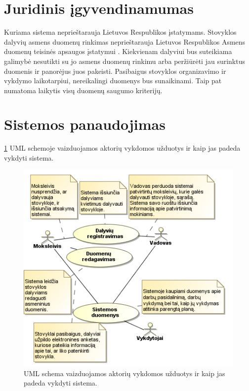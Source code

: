 \section{Juridinis įgyvendinamumas}

Kuriama sistema neprieštarauja Lietuvos Respublikos įstatymams. Stovyklos 
dalyvių asmens duomenų rinkimas neprieštarauja Lietuvos Respublikos 
Asmens duomenų teisinės apsaugos įstatymui \cite{istat_duom_apsaug}.
Kiekvienam dalyviui bus 
suteikiama galimybė nesutikti su jo asmens duomenų rinkimu arba 
peržiūrėti jau surinktus duomenis ir panorėjus juos pakeisti. 
Pasibaigus stovyklos organizavimo ir vykdymo laikotarpiui, nereikalingi 
duomenys bus sunaikinami. Taip pat numatoma laikytis visų duomenų saugumo 
kriterijų.

\section{Sistemos panaudojimas}

\ref{fig:uml_tasks} UML schemoje vaizduojamos aktorių vykdomos užduotys ir 
kaip jas padeda vykdyti sistema.

\begin{figure}[h!]
  \begin{center}
    \includegraphics[scale=0.8]{images/sistemos_panaudojimas.png}
  \end{center}
  \caption{UML schema vaizduojamos aktorių vykdomos užduotys ir kaip jas
    padeda vykdyti sistema.}
  \label{fig:uml_tasks}
\end{figure}

